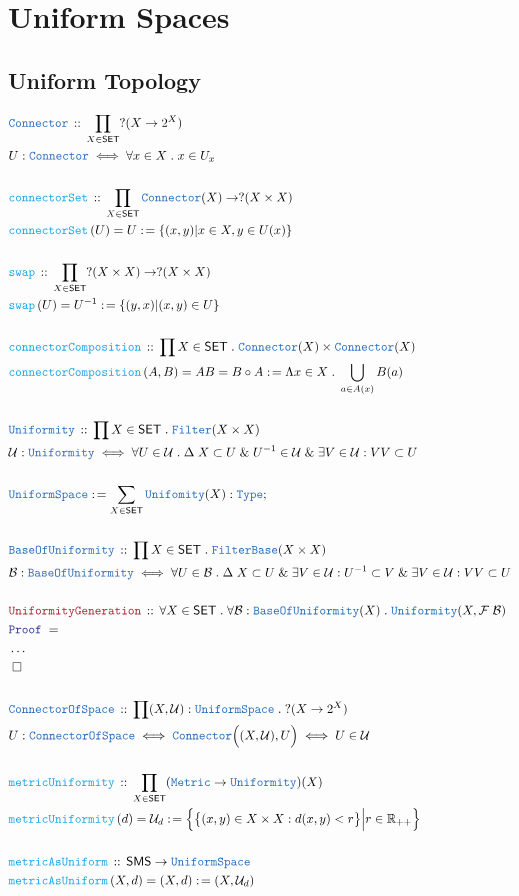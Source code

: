 \documentclass[12pt]{scrartcl}
\newcommand{\TYPE}[1]{\textcolor{NavyBlue}{\mathtt{#1}}}
\newcommand{\FUNC}[1]{\textcolor{Cerulean}{\mathtt{#1}}}
\newcommand{\LOGIC}[1]{\textcolor{Blue}{\mathtt{#1}}}
\newcommand{\THM}[1]{\textcolor{Maroon}{\mathtt{#1}}}
\renewcommand{\.}{\; . \;}
\newcommand{\de}{: \kern 0.1pc =}
\newcommand{\Act}[1]{\left( #1 \right)}
\newcommand{\Theorem}[2]{& \THM{#1} \, :: \, #2 \\ & \Proof = \\ }
\newcommand{\DeclareType}[2]{& \TYPE{#1} \, :: \, #2 \\}
\newcommand{\DefineType}[3]{& #1 : \TYPE{#2} \iff #3 \\}
\newcommand{\DefineNamedType}[4]{& #1 : \TYPE{#2} \iff #3 \iff #4 \\}
\newcommand{\DeclareFunc}[2]{& \FUNC{#1} \, :: \, #2 \\}
\newcommand{\DefineNamedFunc}[4]{&  \FUNC{#1}\Act{#2} = #3 \de #4 \\}
\newcommand{\Page}[1]{ \begin{align*} #1 \end{align*}   }
\newcommand{\NoProof}{ & \ldots \\ \EndProof}
\renewcommand{\And}{\; \& \;}
\newcommand{\Type}{\TYPE{Type}}
\newcommand{\Reals}{\mathbb{R} }
\newcommand{\Conclude}[3]{& #1 \de #2 : #3; \\}
\newcommand{\QED}{\; \square}
\newcommand{\EndProof}{& \QED \\}
\newcommand{\Proof}{\LOGIC{Proof} \; }
\newcommand{\B}{\mathcal{B}}
\newcommand{\SET}{\mathsf{SET}}
\newcommand{\U}{\mathcal{U}}
\newcommand{\F}{\mathcal{F}}
\newcommand{\SMS}{\mathsf{SMS}}
\begin{document}
\section{Uniform Spaces}
\subsection{Uniform Topology}
\Page{
	\DeclareType{Connector}{\prod_{ X \in \SET} ?(X \to 2^X)}
	\DefineType{U}{Connector}{\forall x \in X \. x \in U_x }
	\\
	\DeclareFunc{connectorSet}{\prod_{X \in \SET}  \TYPE{Connector}(X) \to ?(X \times X)}
	\DefineNamedFunc{connectorSet}{U}{U}{\{  (x,y)  | x \in X, y \in U(x)  \}}
	\\
	\DeclareFunc{swap}{\prod_{X \in \SET}   ?(X \times X) \to ?(X \times X)}
	\DefineNamedFunc{swap}{U}{U^{-1}}{\{  (y,x)  | (x,y) \in U  \}}
	\\
	\DeclareFunc{connectorComposition}{\prod X \in \SET \. \TYPE{Connector}(X) \times \TYPE{Connector}(X)}
	\DefineNamedFunc{connectorComposition}{A,B}{AB = B \circ A}{\Lambda x \in X \. \bigcup_{a \in A(x)} B(a)}
	\\
	\DeclareType{Uniformity}{\prod X \in \SET \. \TYPE{Filter}(X \times X)}
	\DefineType{\U}{Uniformity}{ \forall U \in \U \. \Delta \; X \subset U \And U^{-1} \in \U \And \exists V \in \U : VV \subset U }
	\\
	\Conclude{\TYPE{UniformSpace}}{\sum_{ X \in \SET}   \TYPE{Unifomity}(X) }{\Type}
	\\
	\DeclareType{BaseOfUniformity}{\prod X \in \SET \. \TYPE{FilterBase}(X \times X)}
	\DefineType{\B}{BaseOfUniformity}{ \forall U \in \B \. \Delta \; X \subset U \And \exists V \in \U : U^{-1} \subset V \And \exists V \in \U :VV \subset U }
	\\
	\Theorem{UniformityGeneration}{\forall X \in \SET \. \forall \B : \TYPE{BaseOfUniformity}(X) \. \TYPE{Uniformity}(X,\F\;\B)}
	\NoProof
	\\
	\DeclareType{ConnectorOfSpace}{\prod (X,\U) : \TYPE{UniformSpace} \. ?(X \to 2^X)}
	\DefineNamedType{U}{ConnectorOfSpace}{\TYPE{Connector}\Big((X,\U),U\Big)}{U \in \U}
	\\
	\DeclareFunc{metricUniformity}{\prod_{X \in \SET} (\TYPE{Metric} \to \TYPE{Uniformity})(X)}
	\DefineNamedFunc{metricUniformity}{d}{\U_d}{\Big\{  \big\{  (x,y) \in X \times X :  d(x,y) < r  \big\} \Big| r \in \Reals_{++} \Big\}}
	\\
	\DeclareFunc{metricAsUniform}{\SMS \to \TYPE{UniformSpace}}
	\DefineNamedFunc{metricAsUniform}{X,d}{(X,d)}{ (X,\U_d)}
}
\end{document}
